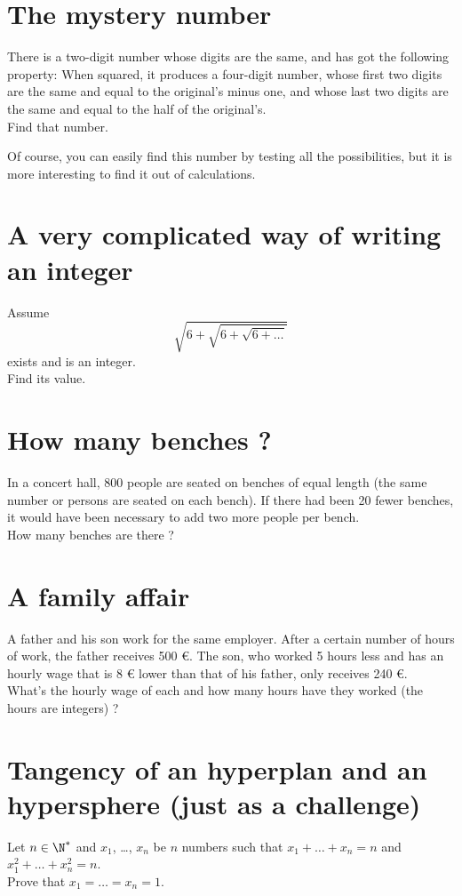 \documentclass[12pt,a4paper,article,english,firamath]{nsi}
\begin{document}
\maketitle


\section*{The mystery number}
There is a two-digit number whose digits are the same, and has got the following property: When squared, it produces a four-digit number, whose first two digits are the same and equal to the original's minus one, and whose last two digits are the same and equal to the half of the original's.\\
Find that number.

\begin{remarque}[]
    Of course, you can easily find this number by testing all the possibilities, but it is more interesting to find it out of calculations.
\end{remarque}


\section*{A very complicated way of writing an integer}

Assume $$\sqrt{6+\sqrt{6+\sqrt{6+\ldots}}}$$ exists and is an integer.\\
Find its value.



\section*{How many benches ?}
In a concert hall, 800 people are seated on benches of equal length (the same number or persons are seated on each bench). If there had been 20 fewer benches, it would have been necessary to add two more people per bench.\\
How many benches are there ?


\section*{A family affair}
A father and his son work for the same employer. After a certain number of hours of work, the father receives 500 €. The son, who worked 5 hours less and has an hourly wage that is 8 € lower than that of his father, only receives 240 €. \\

What's the hourly wage of each and how many hours have they worked (the hours are integers) ?

\section*{Tangency of an hyperplan and an hypersphere \small(just as a challenge)}

Let $n\in\N^*$ and $x_1$, \ldots, $x_n$ be $n$ numbers such that $x_1+\ldots +x_n = n$ and $x_1^2+\ldots +x_n^2 = n$.\\

Prove that $x_1=\ldots=x_n=1$.
\end{document}
